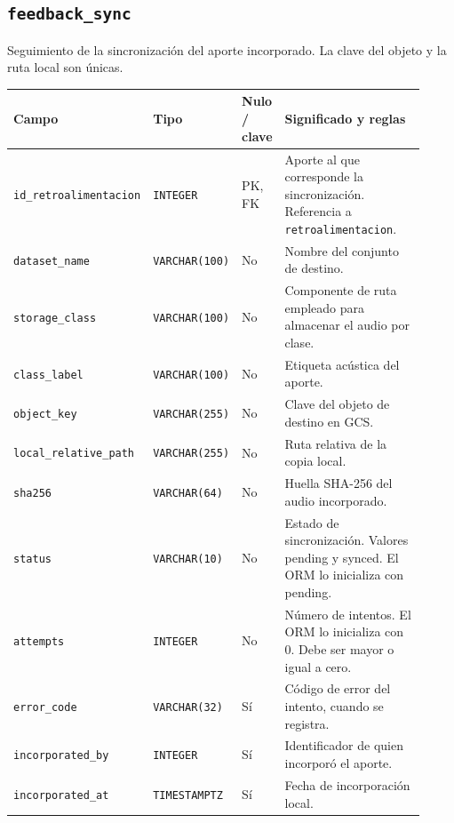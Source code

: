 \subsection*{\texttt{feedback\_\allowbreak{}sync}}

Seguimiento de la sincronización del aporte incorporado. La clave del objeto y la ruta local son únicas.

\noindent
\begin{tabular}{@{}p{0.30\linewidth}p{0.16\linewidth}p{0.10\linewidth}p{0.36\linewidth}@{}}
\hline
\textbf{Campo} & \textbf{Tipo} & \textbf{Nulo / clave} & \textbf{Significado y reglas} \\
\hline
\texttt{id\_\allowbreak{}retroalimentacion} & \texttt{INTEGER} & PK, FK & Aporte al que corresponde la sincronización. Referencia a \texttt{retroalimentacion}. \\
\texttt{dataset\_\allowbreak{}name} & \texttt{VARCHAR(100)} & No & Nombre del conjunto de destino. \\
\texttt{storage\_\allowbreak{}class} & \texttt{VARCHAR(100)} & No & Componente de ruta empleado para almacenar el audio por clase. \\
\texttt{class\_\allowbreak{}label} & \texttt{VARCHAR(100)} & No & Etiqueta acústica del aporte. \\
\texttt{object\_\allowbreak{}key} & \texttt{VARCHAR(255)} & No & Clave del objeto de destino en GCS. \\
\texttt{local\_\allowbreak{}relative\_\allowbreak{}path} & \texttt{VARCHAR(255)} & No & Ruta relativa de la copia local. \\
\texttt{sha256} & \texttt{VARCHAR(64)} & No & Huella SHA-256 del audio incorporado. \\
\texttt{status} & \texttt{VARCHAR(10)} & No & Estado de sincronización. Valores pending y synced. El ORM lo inicializa con pending. \\
\texttt{attempts} & \texttt{INTEGER} & No & Número de intentos. El ORM lo inicializa con 0. Debe ser mayor o igual a cero. \\
\texttt{error\_\allowbreak{}code} & \texttt{VARCHAR(32)} & Sí & Código de error del intento, cuando se registra. \\
\texttt{incorporated\_\allowbreak{}by} & \texttt{INTEGER} & Sí & Identificador de quien incorporó el aporte. \\
\texttt{incorporated\_\allowbreak{}at} & \texttt{TIMESTAMPTZ} & Sí & Fecha de incorporación local. \\
\hline
\end{tabular}

